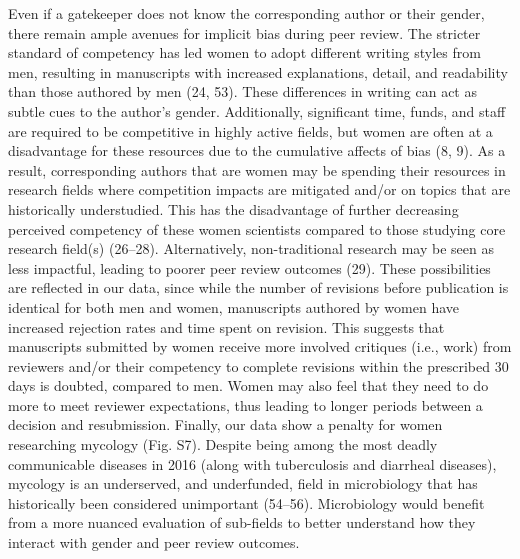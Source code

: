 \documentclass[11pt,]{article}
\begin{document}
Even if a gatekeeper does not know the corresponding author or their
gender, there remain ample avenues for implicit bias during peer review.
The stricter standard of competency has led women to adopt different
writing styles from men, resulting in manuscripts with increased
explanations, detail, and readability than those authored by men (24,
53). These differences in writing can act as subtle cues to the author's
gender. Additionally, significant time, funds, and staff are required to
be competitive in highly active fields, but women are often at a
disadvantage for these resources due to the cumulative affects of bias
(8, 9). As a result, corresponding authors that are women may be
spending their resources in research fields where competition impacts
are mitigated and/or on topics that are historically understudied. This
has the disadvantage of further decreasing perceived competency of these
women scientists compared to those studying core research field(s)
(26--28). Alternatively, non-traditional research may be seen as less
impactful, leading to poorer peer review outcomes (29). These
possibilities are reflected in our data, since while the number of
revisions before publication is identical for both men and women,
manuscripts authored by women have increased rejection rates and time
spent on revision. This suggests that manuscripts submitted by women
receive more involved critiques (i.e., work) from reviewers and/or their
competency to complete revisions within the prescribed 30 days is
doubted, compared to men. Women may also feel that they need to do more
to meet reviewer expectations, thus leading to longer periods between a
decision and resubmission. Finally, our data show a penalty for women
researching mycology (Fig. S7). Despite being among the most deadly
communicable diseases in 2016 (along with tuberculosis and diarrheal
diseases), mycology is an underserved, and underfunded, field in
microbiology that has historically been considered unimportant (54--56).
Microbiology would benefit from a more nuanced evaluation of sub-fields
to better understand how they interact with gender and peer review
outcomes.
\end{document}
